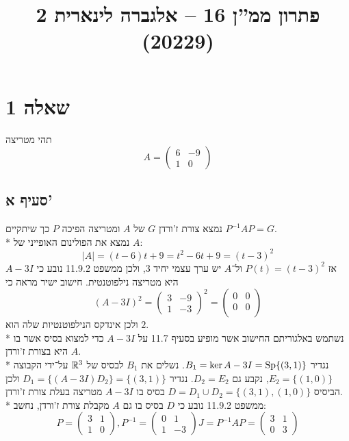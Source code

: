 
\title{פתרון ממ''ן 16 – אלגברה לינארית 2 (20229)}


\maketitle

\section{שאלה 1}
תהי מטריצה
\[
	A = \begin{pmatrix}
		6 & -9 \\
		1 & 0
	\end{pmatrix}
\]
\subsection{סעיף א'}
נמצא צורת ז'ורדן $G$ של $A$ ומטריצה הפיכה $P$ כך שיתקיים $P^{-1} A P = G$. \\*
נמצא את הפולינום האופייני של $A$:
\[
	|A| = (t - 6) t + 9 = t^2 - 6t + 9 = {(t - 3)}^2
\]
אז $P(t) = {(t - 3)}^2$ ול־$A$ יש ערך עצמי יחיד $3$, ולכן ממשפט 11.9.2 נובע כי $A - 3I$ היא מטריצה נילפוטנטית.
חישוב ישיר מראה כי
\[
	{(A - 3I)}^2
	= \begin{pmatrix}
		3 & -9 \\
		1 & -3
	\end{pmatrix}^2
	= \begin{pmatrix}
		0 & 0 \\
		0 & 0 \\
	\end{pmatrix}
\]
ולכן אינדקס הנילפוטנטיות שלה הוא $2$. \\*
נשתמש באלגוריתם החישוב אשר מופיע בסעיף 11.7 על $A - 3I$ כדי למצוא בסיס אשר בו $A$ היא בצורת ז'ורדן. \\*
נגדיר $B_1 = \ker A - 3I = \operatorname{Sp}\{ (3, 1) \}$. נשלים את $B_1$ לבסיס של $\mathbb{R}^3$ על־ידי הקבוצה $E_2 = \{ (1, 0) \}$, נקבע גם $D_2 = E_2$. 
נגדיר $D_1 = \{ (A - 3I) D_2 \} = \{ (3, 1) \}$ ולכן הביסיס $D = D_1 \cup D_2 = \{ (3, 1), (1, 0) \}$ בסיס בו $A - 3I$ מטריצה בעלת צורת ז'ורדן. \\*
ממשפט 11.9.2 נובע כי $D$ בסיס בו גם $A$ מקבלת צורת ז'ורדן, נחשב:
\[
	P = \begin{pmatrix}
		3 & 1 \\
		1 & 0
	\end{pmatrix},
	P^{-1} = \begin{pmatrix}
		0 & 1 \\
		1 & -3
	\end{pmatrix}
	J = P^{-1} A P
	= \begin{pmatrix}
		3 & 1 \\
		0 & 3
	\end{pmatrix}
\]

